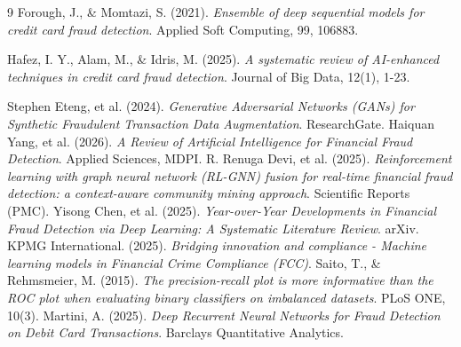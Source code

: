 \documentclass[12pt,a4paper]{report}
\begin{document}
\begin{thebibliography}{9}
Forough, J., \& Momtazi, S. (2021). \textit{Ensemble of deep sequential models for credit card fraud detection}. Applied Soft Computing, 99, 106883.

Hafez, I. Y., Alam, M., \& Idris, M. (2025). \textit{A systematic review of AI-enhanced techniques in credit card fraud detection}. Journal of Big Data, 12(1), 1-23.

 Stephen Eteng, et al. (2024). \textit{Generative Adversarial Networks (GANs) for Synthetic Fraudulent Transaction Data Augmentation}. ResearchGate.
 Haiquan Yang, et al. (2026). \textit{A Review of Artificial Intelligence for Financial Fraud Detection}. Applied Sciences, MDPI.
 R. Renuga Devi, et al. (2025). \textit{Reinforcement learning with graph neural network (RL-GNN) fusion for real-time financial fraud detection: a context-aware community mining approach}. Scientific Reports (PMC).
 Yisong Chen, et al. (2025). \textit{Year-over-Year Developments in Financial Fraud Detection via Deep Learning: A Systematic Literature Review}. arXiv.
 KPMG International. (2025). \textit{Bridging innovation and compliance - Machine learning models in Financial Crime Compliance (FCC)}.
Saito, T., \& Rehmsmeier, M. (2015). \textit{The precision-recall plot is more informative than the ROC plot when evaluating binary classifiers on imbalanced datasets}. PLoS ONE, 10(3).
Martini, A. (2025). \textit{Deep Recurrent Neural Networks for Fraud Detection on Debit Card Transactions}. Barclays Quantitative Analytics.

\end{thebibliography}
\end{document}
